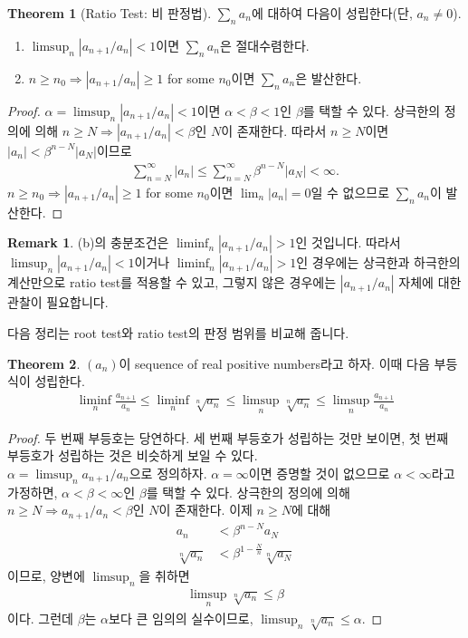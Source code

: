 \documentclass[12pt]{article}
\theoremstyle{definition}
\newtheorem{thm}{Theorem}[section]
\newtheorem*{rem}{Remark}
\newcommand{\abs}[1]{\left\vert#1\right\vert}
\begin{document}
\begin{thm}[Ratio Test: 비 판정법]
	\(\sum_n a_n\)에 대하여 다음이 성립한다(단, \(a_n \neq 0\)).
	\begin{enumerate}[label=(\alph*), leftmargin=2\parindent]
		\item
		\(\limsup_n \abs{a_{n+1}/a_n} < 1\)이면 \(\sum_n a_n\)은 절대수렴한다.
		\item
		\(n \ge n_0 \Rightarrow \abs{a_{n+1}/a_n} \ge 1\) for some \(n_0\)이면 \(\sum_n a_n\)은 발산한다.
	\end{enumerate}
\end{thm}
\begin{proof}
	\(\alpha = \limsup_n \abs{a_{n+1}/a_n} < 1\)이면 \(\alpha < \beta < 1\)인 \(\beta\)를 택할 수 있다. 상극한의 정의에 의해 \(n \ge N \Rightarrow \abs{a_{n+1}/a_n} < \beta\)인 \(N\)이 존재한다. 따라서 \(n \ge N\)이면 \(\abs{a_n} < \beta^{n-N}\abs{a_N}\)이므로
	\begin{gather*}
		\sum_{n=N}^\infty \abs{a_n} \le \sum_{n=N}^\infty \beta^{n-N}\abs{a_N} < \infty.
	\end{gather*}
	\(n \ge n_0 \Rightarrow \abs{a_{n+1}/a_n} \ge 1\) for some \(n_0\)이면 \(\lim_n \abs{a_n} = 0\)일 수 없으므로 \(\sum_n a_n\)이 발산한다.
\end{proof}
\begin{rem}
	(b)의 충분조건은 \(\liminf_n \abs{a_{n+1}/a_n} > 1\)인 것입니다. 따라서 \(\limsup_n \abs{a_{n+1}/a_n} < 1\)이거나 \(\liminf_n \abs{a_{n+1}/a_n} > 1\)인 경우에는 상극한과 하극한의 계산만으로 ratio test를 적용할 수 있고, 그렇지 않은 경우에는 \(\abs{a_{n+1}/a_n}\) 자체에 대한 관찰이 필요합니다.
\end{rem}

다음 정리는 root test와 ratio test의 판정 범위를 비교해 줍니다.

\begin{thm}
	\((a_n)\)이 sequence of real positive numbers라고 하자. 이때 다음 부등식이 성립한다.
	\begin{gather*}
		\liminf_n \frac{a_{n+1}}{a_n} \le \liminf_n \sqrt[n]{a_n} \le \limsup_n \sqrt[n]{a_n} \le \limsup_n \frac{a_{n+1}}{a_n}
	\end{gather*}
\end{thm}
\begin{proof}
	두 번째 부등호는 당연하다. 세 번째 부등호가 성립하는 것만 보이면, 첫 번째 부등호가 성립하는 것은 비슷하게 보일 수 있다.\\
	\(\alpha = \limsup_n a_{n+1}/a_n\)으로 정의하자. \(\alpha = \infty\)이면 증명할 것이 없으므로 \(\alpha < \infty\)라고 가정하면, \(\alpha < \beta < \infty\)인 \(\beta\)를 택할 수 있다. 상극한의 정의에 의해 \(n \ge N \Rightarrow a_{n+1}/a_n < \beta\)인 \(N\)이 존재한다. 이제 \(n \ge N\)에 대해
	\begin{align*}
		a_n &< \beta^{n-N} a_N\\
		\sqrt[n]{a_n} &< \beta^{1-\frac{N}{n}} \sqrt[n]{a_N}
	\end{align*}
	이므로, 양변에 \(\limsup_n\)을 취하면
	\begin{align*}
		\limsup_n \sqrt[n]{a_n} \le \beta
	\end{align*}
	이다. 그런데 \(\beta\)는 \(\alpha\)보다 큰 임의의 실수이므로, \(\limsup_n \sqrt[n]{a_n} \le \alpha\).
\end{proof}
\end{document}
